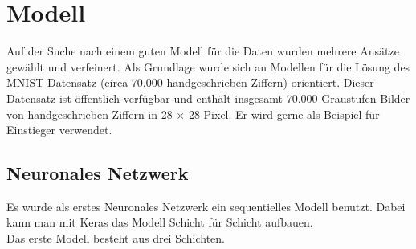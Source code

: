 \section{Modell}
Auf der Suche nach einem guten Modell für die Daten wurden mehrere Ansätze gewählt und verfeinert. Als Grundlage wurde sich an Modellen für die Lösung des MNIST-Datensatz (circa 70.000 handgeschrieben Ziffern) orientiert.  Dieser Datensatz ist öffentlich verfügbar und enthält insgesamt 70.000 Graustufen-Bilder von handgeschrieben Ziffern in 28 $\times$ 28 Pixel.  Er wird gerne als Beispiel für Einstieger verwendet.  \label{MNIST}
\subsection{Neuronales Netzwerk}
Es wurde als erstes Neuronales Netzwerk ein sequentielles Modell benutzt.  Dabei kann man mit Keras das Modell Schicht für Schicht aufbauen.\\
Das erste Modell besteht aus drei Schichten.\\


